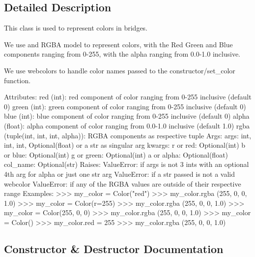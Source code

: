 \subsection{Detailed Description}
\begin{DoxyVerb}This class is used to represent colors in bridges.

We use and RGBA model to represent colors, with the Red Green and Blue components ranging from 0-255,
with the alpha ranging from 0.0-1.0 inclusive.

We use webcolors to handle color names passed to the constructor/set_color function.

Attributes:
    red (int): red component of color ranging from 0-255 inclusive (default 0)
    green (int): green component of color ranging from 0-255 inclusive (default 0)
    blue (int): blue component of color ranging from 0-255 inclusive (default 0)
    alpha (float): alpha component of color ranging from 0.0-1.0 inclusive (default 1.0)
    rgba (tuple(int, int, int, alpha)): RGBA components as respective tuple
Args:
    args: int, int, int, Optional(float) or a str as singular arg
    kwargs:
        r or red: Optional(int)
        b or blue: Optional(int)
        g or green: Optional(int)
        a or alpha: Optional(float)
        col_name: Optional(str)
Raises:
    ValueError: if args is not 3 ints with an optional 4th arg for alpha or just one str arg
    ValueError: if a str passed is not a valid webcolor
    ValueError: if any of the RGBA values are outside of their respective range
Examples:
    >>> my_color = Color("red")
    >>> my_color.rgba
    (255, 0, 0, 1.0)
    >>> my_color = Color(r=255)
    >>> my_color.rgba
    (255, 0, 0, 1.0)
    >>> my_color = Color(255, 0, 0)
    >>> my_color.rgba
    (255, 0, 0, 1.0)
    >>> my_color = Color()
    >>> my_color.red = 255
    >>> my_color.rgba
    (255, 0, 0, 1.0)
\end{DoxyVerb}
 

\subsection{Constructor \& Destructor Documentation}
\hypertarget{classbridges_1_1color_1_1_color_aacbbede0aceb8f1ca36d78379614bb1a}{}
